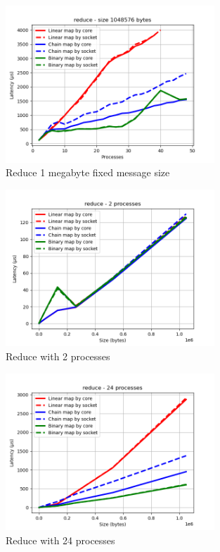 \begin{figure}[h!]
    \centering
    \includegraphics[width=0.7\textwidth]{../plots/reduce_fixedSize1048576.png}
    \caption{Reduce 1 megabyte fixed message size}
    \label{fig:reduce_fixed_message_size_1048576}
\end{figure}

\begin{figure}[h!]
    \centering
    \includegraphics[width=0.7\textwidth]{../plots/reduce_fixedProcesses2.png}
    \caption{Reduce with 2 processes}
    \label{fig:reduce_fixed_processes_2}
\end{figure}

\begin{figure}[h!]
    \centering
    \includegraphics[width=0.7\textwidth]{../plots/reduce_fixedProcesses24.png}
    \caption{Reduce with 24 processes}
    \label{fig:reduce_fixed_processes_24}
\end{figure}
